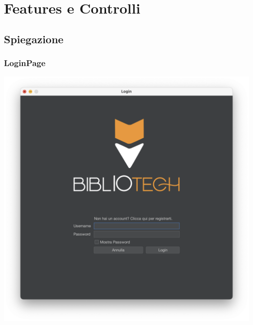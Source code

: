 \chapter{Features e Controlli}
\section{Spiegazione}
\subsection{LoginPage}
\includegraphics[scale=0.25]{Immagini/Schermate/Login_Register/LoginPage.png}


